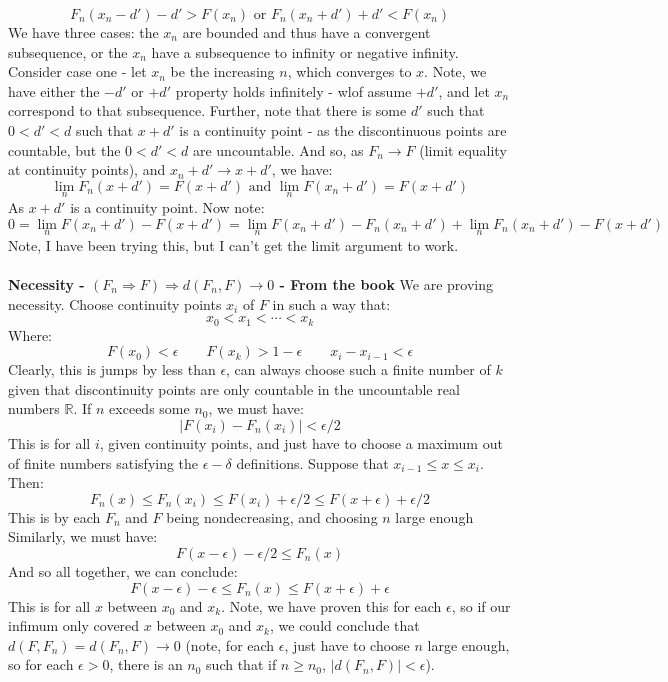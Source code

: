 \documentclass[12pt,a4paper]{article}
\newcommand{\1}[1]{\mathbbm{1}\left\{ #1 \right\}}
\newcommand{\R}{\mathbb{R}}
\begin{document}
$$
	F_n(x_n - d') - d' > F(x_n) \text{ or }
	F_n(x_n + d') + d' < F(x_n) 
$$
We have three cases: the $x_n$ are bounded and thus have a convergent subsequence, or the $x_n$ have a subsequence to infinity or negative infinity. Consider case one - let $x_n$ be the increasing $n$, which converges to $x$. Note, we have either the $-d'$ or $+d'$ property holds infinitely - wlof assume $+d'$, and let $x_n$ correspond to that subsequence. Further, note that there is some $d'$ such that $0 < d' < d$ such that $x + d'$ is a continuity point - as the discontinuous points are countable, but the $0 < d' < d$ are uncountable. And so, as $F_n \rightarrow F$ (limit equality at continuity points), and $x_n + d' \to x + d'$, we have:
$$
	\lim_n F_n(x + d') = F(x + d') \text{ and }
	\lim_n F(x_n + d') = F(x + d')
$$
As $x + d'$ is a continuity point. Now note:
$$
	0 = \lim_n F(x_n + d') - F(x + d') =
	\lim_n F(x_n + d') - F_n(x_n + d') + \lim_n F_n(x_n + d') - F(x + d')
$$
Note, I have been trying this, but I can't get the limit argument to work.
\\\\
\textbf{Necessity - $(F_n \Rightarrow F) \Rightarrow d(F_n,F) \to 0$ - From the book} We are proving necessity. Choose continuity points $x_i$ of $F$ in such a way that:
$$
	x_0 < x_1 < \cdots < x_k
$$
Where:
$$
	F(x_0) < \epsilon \quad\quad F(x_k) > 1 - \epsilon \quad\quad
	x_i - x_{i-1} < \epsilon
$$
Clearly, this is jumps by less than $\epsilon$, can always choose such a finite number of $k$ given that discontinuity points are only countable in the uncountable real numbers $\R$. If $n$ exceeds some $n_0$, we must have:
$$
	\left|F(x_i) - F_n(x_i)\right| < \epsilon/2
$$
This is for all $i$, given continuity points, and just have to choose a maximum out of finite numbers satisfying the $\epsilon-\delta$ definitions. Suppose that $x_{i-1} \leq x \leq x_i$. Then:
$$
	F_n(x) \leq F_n(x_i) \leq F(x_i) + \epsilon/2 \leq F(x + \epsilon) + \epsilon/2
$$
This is by each $F_n$ and $F$ being nondecreasing, and choosing $n$ large enough Similarly, we must have:
$$
	F(x - \epsilon) - \epsilon/2 \leq F_n(x)
$$
And so all together, we can conclude:
$$
	F(x - \epsilon) - \epsilon \leq F_n(x) \leq F(x + \epsilon) + \epsilon
$$
This is for all $x$ between $x_0$ and $x_k$. Note, we have proven this for each $\epsilon$, so if our infimum only covered $x$ between $x_0$ and $x_k$, we could conclude that $d(F,F_n) = d(F_n,F) \to 0$ (note, for each $\epsilon$, just have to choose $n$ large enough, so for each $\epsilon > 0$, there is an $n_0$ such that if $n \geq n_0$, $|d(F_n,F)| < \epsilon$).
\end{document}
